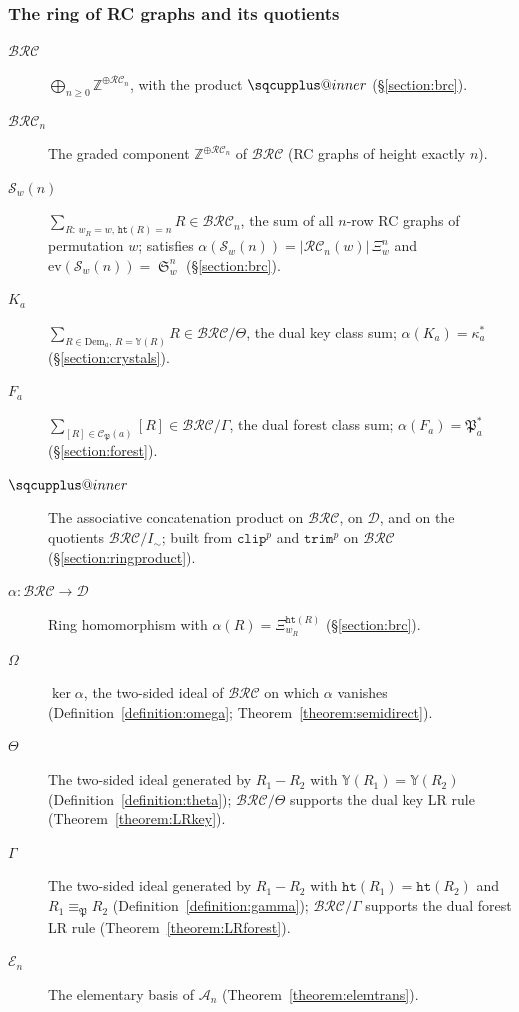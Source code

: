 \documentclass{amsart}
\makeatletter
\newcommand{\sqcupplus@inner}[2]{%
  \vcenter{\hbox{\ooalign{%
    \hfil$\m@th#1\sqcup$\hfil\cr
    \hfil\raisebox{0.15ex}{$\m@th#1\scriptscriptstyle+$}\hfil\cr
  }}}%
}
\newcommand{\sqcupplus}{\mathbin{\mathpalette\sqcupplus@inner\relax}}
\theoremstyle{definition}
\theoremstyle{remark}
\numberwithin{equation}{subsection}
\DeclareMathOperator{\sch}{\mathfrak{S}}
\newcommand{\wof}[1]{w_{#1}}
\newcommand{\trm}{\mathtt{trim}}
\newcommand{\hr}{\mathtt{ht}}
\newcommand{\clp}{\mathtt{clip}}
\newcommand{\BRC}{\mathcal{BRC}}
\newcommand{\RC}{\mathcal{RC}}
\newcommand{\dsch}{\ensuremath{\Xi}}
\newcommand{\coma}{\mathcal{A}}
\newcommand{\dcoma}{\mathcal{D}}
\newcommand{\forest}{\mathfrak{P}}
\makeatother
\begin{document}
\subsubsection*{The ring of RC graphs and its quotients}
\begin{description}
\item[$\BRC$] $\bigoplus_{n\geq 0}\mathbb{Z}^{\oplus\RC_n}$, with the product $\sqcupplus$ (\S\ref{section:brc}).
\item[$\BRC_n$] The graded component $\mathbb{Z}^{\oplus \RC_n}$ of $\BRC$ (RC graphs of height exactly $n$).
\item[$\mathcal{S}_w(n)$] $\sum_{R:\,\wof{R}=w,\,\hr(R)=n}R\in\BRC_n$, the sum of all $n$-row RC graphs of permutation $w$; satisfies $\alpha(\mathcal{S}_w(n))=|\RC_n(w)|\,\dsch_w^n$ and $\mathrm{ev}(\mathcal{S}_w(n))=\sch_w^n$ (\S\ref{section:brc}).
\item[$K_a$] $\sum_{R\in\mathrm{Dem}_a,\,R=\mathbb{Y}(R)} R\in\BRC/\Theta$, the dual key class sum; $\alpha(K_a)=\kappa_a^*$ (\S\ref{section:crystals}).
\item[$F_a$] $\sum_{[R]\in\mathcal{C}_\forest(a)}[R]\in\BRC/\Gamma$, the dual forest class sum; $\alpha(F_a)=\forest_a^*$ (\S\ref{section:forest}).
\item[$\sqcupplus$] The associative concatenation product on $\BRC$, on $\dcoma$, and on the quotients $\BRC/I_\sim$; built from $\clp^p$ and $\trm^p$ on $\BRC$ (\S\ref{section:ringproduct}).
\item[$\alpha:\BRC\to\dcoma$] Ring homomorphism with $\alpha(R)=\dsch_{\wof{R}}^{\hr(R)}$ (\S\ref{section:brc}).
\item[$\Omega$] $\ker\alpha$, the two-sided ideal of $\BRC$ on which $\alpha$ vanishes (Definition~\ref{definition:omega}; Theorem~\ref{theorem:semidirect}).
\item[$\Theta$] The two-sided ideal generated by $R_1-R_2$ with $\mathbb{Y}(R_1)=\mathbb{Y}(R_2)$ (Definition~\ref{definition:theta}); $\BRC/\Theta$ supports the dual key LR rule (Theorem~\ref{theorem:LRkey}).
\item[$\Gamma$] The two-sided ideal generated by $R_1-R_2$ with $\hr(R_1)=\hr(R_2)$ and $R_1\equiv_\forest R_2$ (Definition~\ref{definition:gamma}); $\BRC/\Gamma$ supports the dual forest LR rule (Theorem~\ref{theorem:LRforest}).
\item[$\mathcal{E}_n$] The elementary basis of $\coma_n$ (Theorem~\ref{theorem:elemtrans}).
\end{description}
\end{document}
